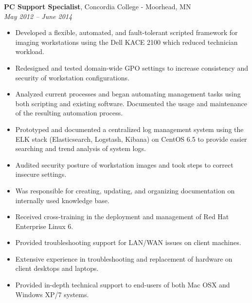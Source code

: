 {\bf PC Support Specialist}, Concordia College - Moorhead, MN\\
{\it May 2012 – June 2014}
\begin{itemize}
	\item Developed a flexible, automated, and fault-tolerant scripted framework for imaging workstations using the Dell KACE 2100 which reduced technician workload.
	\item Redesigned and tested domain-wide GPO settings to increase consistency and security of workstation configurations.
	\item Analyzed current processes and began automating management tasks using both scripting and existing software. Documented the usage and maintenance of the resulting automation process.
	\item Prototyped and documented a centralized log management system using the ELK stack (Elasticsearch, Logstash, Kibana) on CentOS 6.5 to provide easier searching and trend analysis of system logs.
	\item Audited security posture of workstation images and took steps to correct insecure settings.
	\item Was responsible for creating, updating, and organizing documentation on internally used knowledge base.
	\item Received cross-training in the deployment and management of Red Hat Enterprise Linux 6.
	\item Provided troubleshooting support for LAN/WAN issues on client machines.
	\item Extensive experience in troubleshooting and replacement of hardware on client desktops and laptops.
	\item Provided in-depth technical support to end-users of both Mac OSX and Windows XP/7 systems.
\end{itemize}